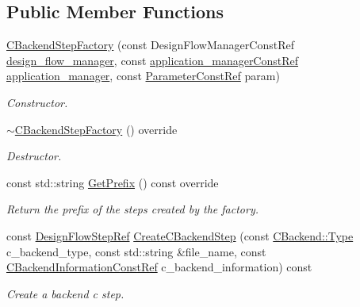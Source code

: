 \subsection*{Public Member Functions}
\begin{DoxyCompactItemize}
\item 
\hyperlink{classCBackendStepFactory_a7029c2c9d67bc75052c963a3a179e049}{C\+Backend\+Step\+Factory} (const Design\+Flow\+Manager\+Const\+Ref \hyperlink{classDesignFlowStepFactory_ae7854875d87ed8d2fb4d82b2fa017b79}{design\+\_\+flow\+\_\+manager}, const \hyperlink{application__manager_8hpp_abb985163a2a3fb747f6f03b1eaadbb44}{application\+\_\+manager\+Const\+Ref} \hyperlink{classapplication__manager}{application\+\_\+manager}, const \hyperlink{Parameter_8hpp_a37841774a6fcb479b597fdf8955eb4ea}{Parameter\+Const\+Ref} param)
\begin{DoxyCompactList}\small\item\em Constructor. \end{DoxyCompactList}\item 
\hyperlink{classCBackendStepFactory_aa1e12def0da538e05942f60146729316}{$\sim$\+C\+Backend\+Step\+Factory} () override
\begin{DoxyCompactList}\small\item\em Destructor. \end{DoxyCompactList}\item 
const std\+::string \hyperlink{classCBackendStepFactory_acfa5b90eed2d622eb52ab9b3864d9071}{Get\+Prefix} () const override
\begin{DoxyCompactList}\small\item\em Return the prefix of the steps created by the factory. \end{DoxyCompactList}\item 
const \hyperlink{design__flow__step_8hpp_a9dd6b4474ddf52d41a78b1aaa12ae6c8}{Design\+Flow\+Step\+Ref} \hyperlink{classCBackendStepFactory_a365dcca2ec7520ef2345ece5797fc8b4}{Create\+C\+Backend\+Step} (const \hyperlink{classCBackend_abadfd9ef309ba4d12e648fe2e3fff08b}{C\+Backend\+::\+Type} c\+\_\+backend\+\_\+type, const std\+::string \&file\+\_\+name, const \hyperlink{c__backend__information_8hpp_affe03f2ae5a23aa0efcd9d958c85280d}{C\+Backend\+Information\+Const\+Ref} c\+\_\+backend\+\_\+information) const
\begin{DoxyCompactList}\small\item\em Create a backend c step. \end{DoxyCompactList}\end{DoxyCompactItemize}
